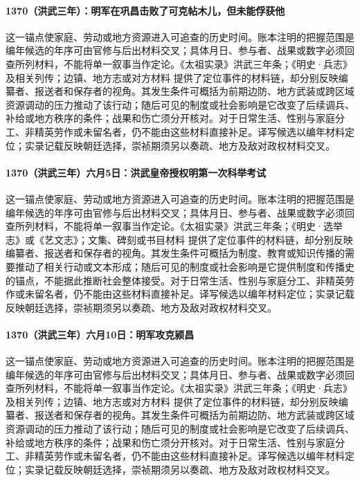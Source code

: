 \paragraph{1370（洪武三年）：明军在巩昌击败了可克帖木儿，但未能俘获他} 这一锚点使家庭、劳动或地方资源进入可追查的历史时间。账本注明的把握范围是编年候选的年序可由官修与后出材料交叉；具体月日、参与者、战果或数字必须回查所列材料，不能将单一叙事当作定论。《太祖实录》洪武三年条；《明史·兵志》及相关列传；边镇、地方志或对方材料 提供了定位事件的材料链，却分别反映编纂者、报送者和保存者的视角。其发生条件可概括为前期边防、地方武装或跨区域资源调动的压力推动了该行动；随后可见的制度或社会影响是它改变了后续调兵、补给或地方秩序的条件；战果和伤亡须分开核对。对于日常生活、性别与家庭分工、非精英劳作或未留名者，仍不能由这些材料直接补足。译写候选以编年材料定位；实录记载反映朝廷选择，崇祯期须另以奏疏、地方及敌对政权材料交叉。

\paragraph{1370（洪武三年）六月5日：洪武皇帝授权明第一次科举考试} 这一锚点使家庭、劳动或地方资源进入可追查的历史时间。账本注明的把握范围是编年候选的年序可由官修与后出材料交叉；具体月日、参与者、战果或数字必须回查所列材料，不能将单一叙事当作定论。《太祖实录》洪武三年条；《明史·选举志》或《艺文志》；文集、碑刻或书目材料 提供了定位事件的材料链，却分别反映编纂者、报送者和保存者的视角。其发生条件可概括为制度、教育或知识传播的需要推动了相关行动或文本形成；随后可见的制度或社会影响是它提供制度和传播史的锚点，不能据此推断社会整体接受。对于日常生活、性别与家庭分工、非精英劳作或未留名者，仍不能由这些材料直接补足。译写候选以编年材料定位；实录记载反映朝廷选择，崇祯期须另以奏疏、地方及敌对政权材料交叉。

\paragraph{1370（洪武三年）六月10日：明军攻克颍昌} 这一锚点使家庭、劳动或地方资源进入可追查的历史时间。账本注明的把握范围是编年候选的年序可由官修与后出材料交叉；具体月日、参与者、战果或数字必须回查所列材料，不能将单一叙事当作定论。《太祖实录》洪武三年条；《明史·兵志》及相关列传；边镇、地方志或对方材料 提供了定位事件的材料链，却分别反映编纂者、报送者和保存者的视角。其发生条件可概括为前期边防、地方武装或跨区域资源调动的压力推动了该行动；随后可见的制度或社会影响是它改变了后续调兵、补给或地方秩序的条件；战果和伤亡须分开核对。对于日常生活、性别与家庭分工、非精英劳作或未留名者，仍不能由这些材料直接补足。译写候选以编年材料定位；实录记载反映朝廷选择，崇祯期须另以奏疏、地方及敌对政权材料交叉。

